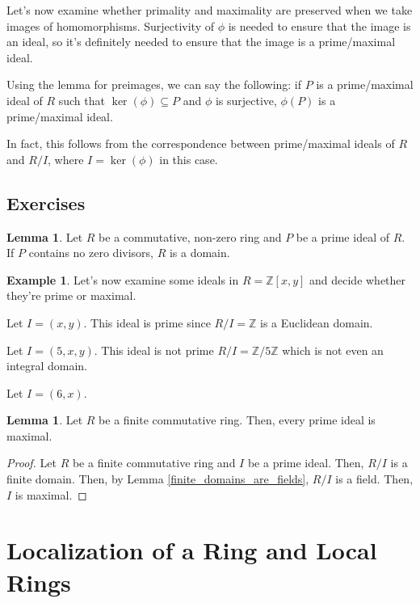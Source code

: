 \documentclass{article}
\theoremstyle{definition}
\newtheorem{lemma}[theorem]{Lemma}
\newtheorem{example}[theorem]{Example}
\newcommand{\Z}{\mathbb{Z}}
\begin{document}
Let's now examine whether primality and maximality are preserved when we take images of homomorphisms.
Surjectivity of $\phi$ is needed to ensure that the image is an ideal, so it's definitely needed to
ensure that the image is a prime/maximal ideal.

Using the lemma for preimages, we can say the following: if $P$ is a prime/maximal ideal of $R$
such that $\ker(\phi) \subseteq P$ and $\phi$ is surjective, $\phi(P)$ is a prime/maximal ideal.

In fact, this follows from the correspondence between prime/maximal ideals of $R$ and $R/I$, where
$I = \ker(\phi)$ in this case.

\newpage

\subsection{Exercises}

\begin{lemma}
    Let $R$ be a commutative, non-zero ring and $P$ be a prime ideal of $R$.
    If $P$ contains no zero divisors, $R$ is a domain.
\end{lemma}

\begin{example}
    Let's now examine some ideals in $R = \Z[x,y]$ and decide whether they're prime or maximal.

    Let $I = (x,y)$. This ideal is prime since $R/I = \Z$ is a Euclidean domain.

    Let $I = (5,x,y)$. This ideal is not prime $R/I = \Z/5\Z$ which is not even an integral domain.

    Let $I = (6,x)$. 
\end{example}

\begin{lemma}
    Let $R$ be a finite commutative ring. Then, every prime ideal is maximal.
\end{lemma}
\begin{proof}
    Let $R$ be a finite commutative ring and $I$ be a prime ideal.
    Then, $R/I$ is a finite domain. Then, by Lemma \ref{finite_domains_are_fields},
    $R/I$ is a field. Then, $I$ is maximal.
\end{proof}

\newpage

\section{Localization of a Ring and Local Rings}
\end{document}
